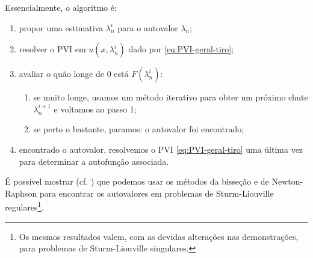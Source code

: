 \documentclass[twocolumn,showpacs,%
  nofootinbib,aps,superscriptaddress,%
  eqsecnum,prd,notitlepage,showkeys,10pt]{revtex4-1}
\begin{document}
Essencialmente, o algoritmo é:
%
\begin{enumerate}
    \item propor uma estimativa $\lambda_n^i$ para o autovalor $\lambda_n$; 
    \item resolver o PVI em $u(x, \lambda_n^i)$ dado por \eqref{eq:PVI-geral-tiro};
    \item avaliar o quão longe de $0$ está $F(\lambda_n^i)$:
    \begin{enumerate}
        \item se muito longe, usamos um método iterativo para obter um próximo 
        chute $\lambda_n^{i+1}$ e voltamos ao passo 1;
        \item se perto o bastante, paramos: o autovalor foi encontrado;
    \end{enumerate}
    \item encontrado o autovalor, resolvemos o PVI \eqref{eq:PVI-geral-tiro} uma
    última vez para determinar a autofunção associada.
\end{enumerate}
%
É possível mostrar (cf. \cite[p.~304-305, Teo.~186 - 188]{Sturm-Liouville}) que
podemos usar os métodos da bisseção e de Newton-Raphson para encontrar os autovalores
em problemas de Sturm-Liouville regulares\footnote{Os mesmos resultados valem, com as devidas
alterações nas demonstrações, para problemas de Sturm-Liouville singulares.}.
\end{document}
